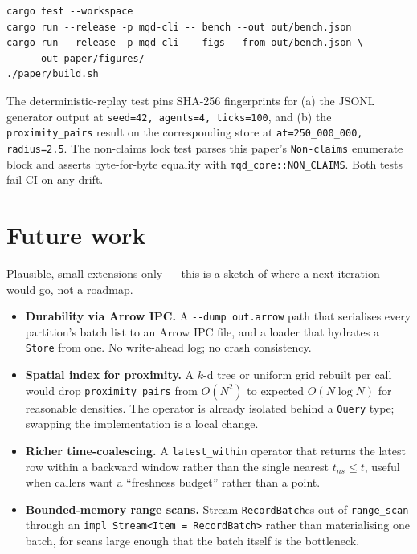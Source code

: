 \documentclass[11pt]{article}
\begin{document}
\begin{lstlisting}
cargo test --workspace
cargo run --release -p mqd-cli -- bench --out out/bench.json
cargo run --release -p mqd-cli -- figs --from out/bench.json \
    --out paper/figures/
./paper/build.sh
\end{lstlisting}

The deterministic-replay test pins SHA-256 fingerprints for (a) the JSONL generator
output at \texttt{seed=42, agents=4, ticks=100}, and (b) the
\texttt{proximity\_pairs} result on the corresponding store at
\texttt{at=250\_000\_000, radius=2.5}. The non-claims lock test parses this paper's
\texttt{Non-claims} enumerate block and asserts byte-for-byte equality with
\texttt{mqd\_core::NON\_CLAIMS}. Both tests fail CI on any drift.

\section{Future work}

Plausible, small extensions only --- this is a sketch of where a next iteration would
go, not a roadmap.

\begin{itemize}
  \item \textbf{Durability via Arrow IPC.} A \texttt{-{}-dump out.arrow} path that
    serialises every partition's batch list to an Arrow IPC file, and a loader that
    hydrates a \texttt{Store} from one. No write-ahead log; no crash consistency.
  \item \textbf{Spatial index for proximity.} A $k$-d tree or uniform grid rebuilt per
    call would drop \texttt{proximity\_pairs} from $O(N^2)$ to expected $O(N \log N)$
    for reasonable densities. The operator is already isolated behind a \texttt{Query}
    type; swapping the implementation is a local change.
  \item \textbf{Richer time-coalescing.} A \texttt{latest\_within} operator that
    returns the latest row within a backward window rather than the single nearest
    $t_{ns} \le t$, useful when callers want a ``freshness budget'' rather than a
    point.
  \item \textbf{Bounded-memory range scans.} Stream \texttt{RecordBatch}es out of
    \texttt{range\_scan} through an \texttt{impl Stream<Item = RecordBatch>} rather
    than materialising one batch, for scans large enough that the batch itself is the
    bottleneck.
\end{itemize}

\appendix
\end{document}
